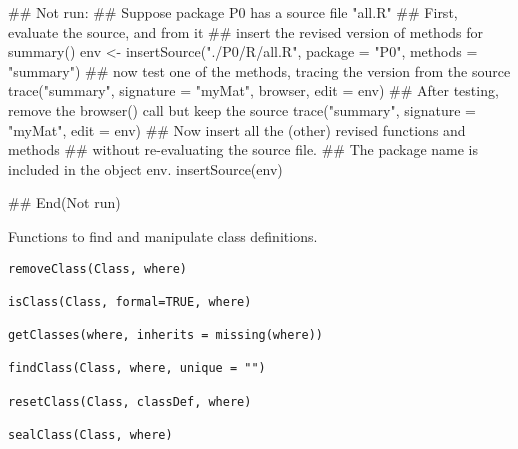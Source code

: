 %
\begin{Examples}
\begin{ExampleCode}
## Not run: 
## Suppose package P0 has a source file "all.R"
## First, evaluate the source, and from it
## insert the revised version of methods for summary()
  env <- insertSource("./P0/R/all.R", package = "P0",
     methods = "summary")
## now test one of the methods, tracing  the version from the source
  trace("summary", signature = "myMat", browser, edit = env)
## After testing, remove the browser() call but keep the source
  trace("summary", signature = "myMat", edit = env)
## Now insert all the (other) revised functions and methods
## without re-evaluating the source file.
## The package name is included in the object env.
  insertSource(env)

## End(Not run)
\end{ExampleCode}
\end{Examples}
%
\begin{Description}\relax
Functions to find and manipulate class definitions.
\end{Description}
%
\begin{Usage}
\begin{verbatim}
removeClass(Class, where)

isClass(Class, formal=TRUE, where)

getClasses(where, inherits = missing(where))

findClass(Class, where, unique = "")

resetClass(Class, classDef, where)

sealClass(Class, where)

\end{verbatim}
\end{Usage}
%
